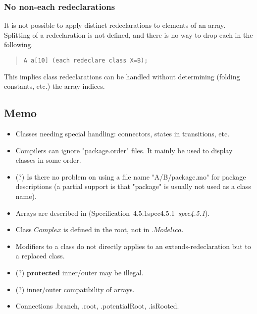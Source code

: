 \documentclass[10pt,b5paper]{article}
\def\specrefx#1#2{Specification~#1\ifx\relax#2\relax{}\else~{\it{}#2}\fi}
\def\specref#1{\specrefx{#1}{\csname spec#1\endcsname}}
\begin{document}
\subsubsection*{No non-each redeclarations}

It is not possible to apply distinct redeclarations to elements of an
array.  Splitting of a redeclaration is not defined, and there is no
way to drop each in the following.

\begin{quote}
\begin{lstlisting}[aboveskip=-\baselineskip]
A a[10] (each redeclare class X=B);
\end{lstlisting}
\end{quote}

This implies class redeclarations can be handled without determining
(folding constants, etc.) the array indices.


\subsection{Memo}

\begin{itemize}

\item Classes needing special handling: connectors, states in
transitions, etc.

\item Compilers can ignore "package.order" files.  It mainly be used
to display classes in some order.

\item (?) Is there no problem on using a file name "A/B/package.mo"
for package descriptions (a partial support is that "package" is
usually not used as a class name).

\item Arrays are described in (\specref{4.5.1}\/).

\item Class $\mathit{Complex}$ is defined in the root, not in
$\mathit{.Modelica}$.

\item Modifiers to a class do not directly applies to an
extends-redeclaration but to a replaced class.

\item (?) $\mathbf{protected}$ inner/outer may be illegal.

\item (?) inner/outer compatibility of arrays.

\item Connections .branch, .root, .potentialRoot, .isRooted.

\end{itemize}
\end{document}
